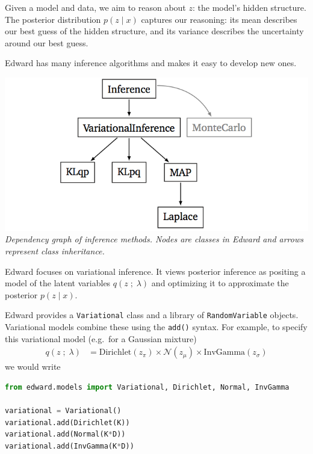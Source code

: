 Given a model and data, we aim to
reason about $z$: the model's hidden structure. The
posterior distribution $p(z \mid x)$ captures our reasoning: its mean
describes our best guess of the hidden structure, and its variance
describes the uncertainty around our best guess.

Edward has many inference algorithms and makes it easy
to develop new ones.

\includegraphics{images/inference_structure.png}
{\small\textit{Dependency graph of inference methods.
Nodes are classes in Edward and arrows represent class inheritance.}}

Edward focuses on variational inference. It views posterior inference
as positing a model of the latent variables $q(z \;;\; \lambda)$ and optimizing it to
approximate the posterior $p(z \mid x)$.


Edward provides a \texttt{Variational} class and a library of
\texttt{RandomVariable} objects. Variational models combine these using
the \texttt{add()} syntax.
For example, to specify this variational model (e.g.~for a Gaussian mixture)
\begin{align*}
  q(z \;;\; \lambda)
  &=
  \text{Dirichlet}(z_\pi)
  \times
  \mathcal{N}(z_\mu)
  \times
  \text{InvGamma}(z_\sigma)
\end{align*}
we would write
\begin{lstlisting}[language=Python]
from edward.models import Variational, Dirichlet, Normal, InvGamma

variational = Variational()
variational.add(Dirichlet(K))
variational.add(Normal(K*D))
variational.add(InvGamma(K*D))
\end{lstlisting}

